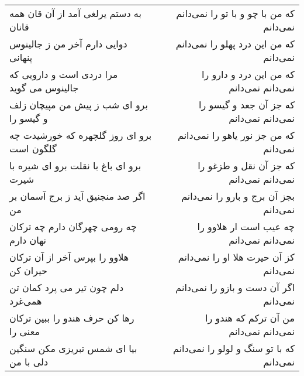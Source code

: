 \begin{center}
\begin{longtable}{l p{0.5cm} r}
\\
به دستم یرلغی آمد از آن قان همه قانان
&&
که من با چو و با تو را نمی‌دانم نمی‌دانم
\\
دوایی دارم آخر من ز جالینوس پنهانی
&&
که من این درد پهلو را نمی‌دانم نمی‌دانم
\\
مرا دردی است و دارویی که جالینوس می گوید
&&
که من این درد و دارو را نمی‌دانم نمی‌دانم
\\
برو ای شب ز پیش من مپیچان زلف و گیسو را
&&
که جز آن جعد و گیسو را نمی‌دانم نمی‌دانم
\\
برو ای روز گلچهره که خورشیدت چه گلگون است
&&
که من جز نور یاهو را نمی‌دانم نمی‌دانم
\\
برو ای باغ با نقلت برو ای شیره با شیرت
&&
که جز آن نقل و طزغو را نمی‌دانم نمی‌دانم
\\
اگر صد منجنیق آید ز برج آسمان بر من
&&
بجز آن برج و بارو را نمی‌دانم نمی‌دانم
\\
چه رومی چهرگان دارم چه ترکان نهان دارم
&&
چه عیب است ار هلاوو را نمی‌دانم نمی‌دانم
\\
هلاوو را بپرس آخر از آن ترکان حیران کن
&&
کز آن حیرت هلا او را نمی‌دانم نمی‌دانم
\\
دلم چون تیر می پرد کمان تن همی‌غرد
&&
اگر آن دست و بازو را نمی‌دانم نمی‌دانم
\\
رها کن حرف هندو را ببین ترکان معنی را
&&
من آن ترکم که هندو را نمی‌دانم نمی‌دانم
\\
بیا ای شمس تبریزی مکن سنگین دلی با من
&&
که با تو سنگ و لولو را نمی‌دانم نمی‌دانم
\\
\end{longtable}
\end{center}
